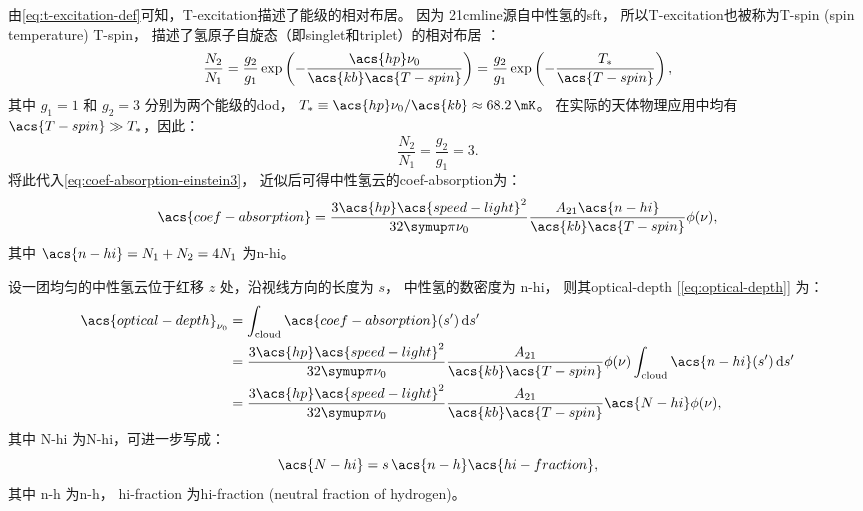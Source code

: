 由\autoref{eq:t-excitation-def}可知，\acl{T-excitation}描述了能级的相对布居。
因为 \ac{21cmline}源自中性氢的\ac{sft}，
所以\acl{T-excitation}也被称为\acl{T-spin} (spin temperature) \ac{T-spin}，
描述了氢原子自旋态（即\ac{singlet}和\ac{triplet}）的相对布居 \cite{field1958}：
\begin{equation}
  \frac{N_2}{N_1} = \frac{g_2}{g_1}
    \exp\left( -\frac{\acs{hp} \nu_0}{\acs{kb} \acs{T-spin}} \right)
    = \frac{g_2}{g_1} \exp\left( -\frac{T_*}{\acs{T-spin}} \right),
\end{equation}
其中
$g_1 = 1$ 和 $g_2 = 3$ 分别为两个能级的\ac{dod}，
$T_* \equiv \acs{hp} \nu_0 / \acs{kb} \approx \SI{68.2}{\mK}$。
在实际的天体物理应用中均有 $\acs{T-spin} \gg T_*$，因此：
\begin{equation}
  \frac{N_2}{N_1} = \frac{g_2}{g_1} = 3 .
\end{equation}
将此代入\autoref{eq:coef-absorption-einstein3}，
近似后可得中性氢云的\acl{coef-absorption}为：
\begin{equation}
  \acs{coef-absorption}
    = \frac{3 \acs{hp} \acs{speed-light}^2}{32\Cpi \nu_0}
      \frac{A_{21} \acs{n-hi}}{\acs{kb} \acs{T-spin}} \phi(\nu) ,
\end{equation}
其中 $\acs{n-hi} = N_1 + N_2 = 4 N_1$ 为\acl{n-hi}。

设一团均匀的中性氢云位于红移 $z$ 处，沿视线方向的长度为 $s$，
中性氢的数密度为 \ac{n-hi}，
则其\acl{optical-depth} [\autoref{eq:optical-depth}] 为：
\begin{align}
  \acs{optical-depth}_{\nu_0}
    & = \int_{\R{cloud}} \acs{coef-absorption}(s') \,\D{s'}  \\
    & = \frac{3 \acs{hp} \acs{speed-light}^2}{32\Cpi \nu_0}
      \frac{A_{21}}{\acs{kb} \acs{T-spin}} \phi(\nu)
      \int_{\R{cloud}} \acs{n-hi}(s') \,\D{s'}  \\
    & = \frac{3 \acs{hp} \acs{speed-light}^2}{32\Cpi \nu_0}
      \frac{A_{21}}{\acs{kb} \acs{T-spin}} \acs{N-hi} \phi(\nu) ,
  \label{eq:21cm-optical-depth1}
\end{align}
其中 \acs{N-hi} 为\acl{N-hi}，可进一步写成：
\begin{equation}
  \label{eq:column-density}
  \acs{N-hi} = s \, \acs{n-h} \acs{hi-fraction} ,
\end{equation}
其中
\acs{n-h} 为\acl{n-h}，
\acs{hi-fraction} 为\acl{hi-fraction} (neutral fraction of hydrogen)。

